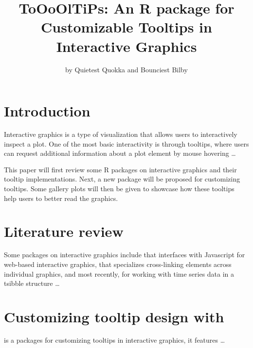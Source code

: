 \title{ToOoOlTiPs: An R package for Customizable Tooltips in Interactive
Graphics}
\author{by Quietest Quokka and Bounciest Bilby}

\maketitle


\hypertarget{introduction}{%
\section{Introduction}\label{introduction}}

Interactive graphics is a type of visualization that allows users to
interactively inspect a plot. One of the most basic interactivity is
through tooltips, where users can request additional information about a
plot element by mouse hovering \ldots{}

This paper will first review some R packages on interactive graphics and
their tooltip implementations. Next, a new package 
will be proposed for customizing tooltips. Some gallery plots will then
be given to showcase how these tooltips help users to better read the
graphics.

\hypertarget{literature-review}{%
\section{Literature review}\label{literature-review}}

Some packages on interactive graphics include 
\citep{plotly} that interfaces with Javascript for web-based interactive
graphics,  \citep{crosstalk} that specializes
cross-linking elements across individual graphics, and most recently,
 \citep{RJ-2021-050} for working with time series
data in a tsibble structure \ldots{}

\hypertarget{customizing-tooltip-design-with}{%
\section{\texorpdfstring{Customizing tooltip design with
}{Customizing tooltip design with }}\label{customizing-tooltip-design-with}}

 is a packages for customizing tooltips in interactive
graphics, it features \ldots{}


